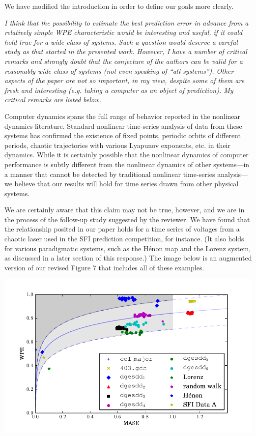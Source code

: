 \documentclass[12pt]{article}
\begin{document}
We have modified the introduction in order to define our goals more
clearly.

\smallskip

\emph{I think that the possibility to estimate the best prediction
  error in advance from a relatively simple WPE characteristic would
  be interesting and useful, if it could hold true for a wide class of
  systems. Such a question would deserve a careful study as that
  started in the presented work. However, I have a number of critical
  remarks and strongly doubt that the conjecture of the authors can be
  valid for a reasonably wide class of systems (not even speaking of
  ``all systems''). Other aspects of the paper are not so important,
  in my view, despite some of them are fresh and interesting
  (e.g. taking a computer as an object of prediction). My critical
  remarks are listed below.}

Computer dynamics spans the full range of behavior reported in the
nonlinear dynamics literature.  Standard nonlinear time-series
analysis of data from these systems has confirmed the existence of
fixed points, periodic orbits of different periods, chaotic
trajectories with various Lyapunov exponents, etc.  in their dynamics.
While it is certainly possible that the nonlinear dynamics of computer
performance is subtly different from the nonlinear dynamics of other
systems---in a manner that cannot be detected by traditional nonlinear
time-series analysis---we believe that our results will hold for time
series drawn from other physical systems.

We are certainly aware that this claim may not be true, however, and
we are in the process of the follow-up study suggested by the
reviewer.  We have found that the relationship posited in our paper
holds for a time series of voltages from a chaotic laser used in the
SFI prediction competition, for instance.  (It also holds for various
paradigmatic systems, such as the H\'{e}non map and the Lorenz system, as
discussed in a later section of this response.)  The image below is an
augmented version of our revised Figure 7 that includes all of these
examples.

\begin{center}
    \includegraphics[width=0.8\columnwidth]{figs/new_prediction_vs_entropy_extras}
\end{center}
\end{document}
